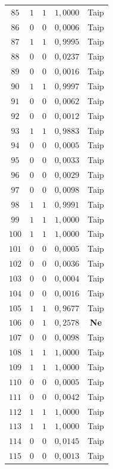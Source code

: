 \begin{longtable}{ccccc}
    $85$ & $1$ & $1$ & $1{,}0000$ & Taip \\
    $86$ & $0$ & $0$ & $0{,}0006$ & Taip \\
    $87$ & $1$ & $1$ & $0{,}9995$ & Taip \\
    $88$ & $0$ & $0$ & $0{,}0237$ & Taip \\
    $89$ & $0$ & $0$ & $0{,}0016$ & Taip \\
    $90$ & $1$ & $1$ & $0{,}9997$ & Taip \\
    $91$ & $0$ & $0$ & $0{,}0062$ & Taip \\
    $92$ & $0$ & $0$ & $0{,}0012$ & Taip \\
    $93$ & $1$ & $1$ & $0{,}9883$ & Taip \\
    $94$ & $0$ & $0$ & $0{,}0005$ & Taip \\
    $95$ & $0$ & $0$ & $0{,}0033$ & Taip \\
    $96$ & $0$ & $0$ & $0{,}0029$ & Taip \\
    $97$ & $0$ & $0$ & $0{,}0098$ & Taip \\
    $98$ & $1$ & $1$ & $0{,}9991$ & Taip \\
    $99$ & $1$ & $1$ & $1{,}0000$ & Taip \\
    $100$ & $1$ & $1$ & $1{,}0000$ & Taip \\
    $101$ & $0$ & $0$ & $0{,}0005$ & Taip \\
    $102$ & $0$ & $0$ & $0{,}0036$ & Taip \\
    $103$ & $0$ & $0$ & $0{,}0004$ & Taip \\
    $104$ & $0$ & $0$ & $0{,}0016$ & Taip \\
    $105$ & $1$ & $1$ & $0{,}9677$ & Taip \\
    $106$ & $0$ & $1$ & $0{,}2578$ & \textbf{Ne} \\
    $107$ & $0$ & $0$ & $0{,}0098$ & Taip \\
    $108$ & $1$ & $1$ & $1{,}0000$ & Taip \\
    $109$ & $1$ & $1$ & $1{,}0000$ & Taip \\
    $110$ & $0$ & $0$ & $0{,}0005$ & Taip \\
    $111$ & $0$ & $0$ & $0{,}0042$ & Taip \\
    $112$ & $1$ & $1$ & $1{,}0000$ & Taip \\
    $113$ & $1$ & $1$ & $1{,}0000$ & Taip \\
    $114$ & $0$ & $0$ & $0{,}0145$ & Taip \\
    $115$ & $0$ & $0$ & $0{,}0013$ & Taip \\

\end{longtable}
